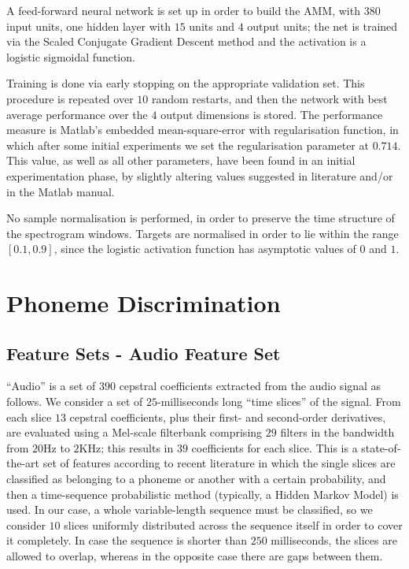 \documentclass[10pt]{article}
\begin{document}
A feed-forward neural network is set up in order to
build the AMM, with $380$ input units, one hidden layer with $15$ units and
$4$ output units; the net is trained via the Scaled Conjugate Gradient
Descent method \cite{MOLLER93} and the activation is a logistic sigmoidal function.

Training is done via early stopping on the appropriate validation set.
This procedure is repeated over $10$ random restarts, and then
the network with best average performance over the $4$ output dimensions is stored.
The performance measure is Matlab's embedded mean-square-error with regularisation
function, in which after some initial experiments we set the regularisation
parameter at $0.714$. This value, as well as all other parameters, have been found in
an initial experimentation phase, by slightly altering values suggested in literature
and/or in the Matlab manual.

No sample normalisation is performed, in order to preserve the time structure of the
spectrogram windows. Targets are normalised in order to lie within the range $[0.1,0.9]$,
since the logistic activation function has asymptotic values of $0$ and $1$.

\section{Phoneme Discrimination}
\subsection{Feature Sets - Audio Feature Set}

``Audio'' is a set of $390$ cepstral coefficients extracted from the audio signal
as follows. We consider a set of $25$-milliseconds long ``time slices'' of the signal.
From each slice $13$ cepstral coefficients, plus their first- and second-order derivatives,
are evaluated using a Mel-scale filterbank comprising $29$ filters in the bandwidth from
$20$Hz to $2$KHz; this results in $39$ coefficients for each slice. This is a state-of-the-art
set of features according to recent literature \cite{bourl,pinto:icassp-phnrecog:2008}
in which the single slices are classified as belonging to a phoneme or another with a certain
probability, and then a time-sequence probabilistic method (typically, a Hidden Markov Model)
is used. In our case, a whole variable-length sequence must be classified, so we consider
$10$ slices uniformly distributed across the sequence itself in order to cover it completely.
In case the sequence is shorter than $250$ milliseconds, the slices are allowed to overlap,
whereas in the opposite case there are gaps between them.
\end{document}
